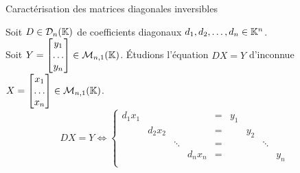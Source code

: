 \documentclass{article}
\renewenvironment{question_kholle}[2][ ]
{
	\subsection{\texorpdfstring{#2}{}}
	\notblank{#1}
	{
		\noindent #1
		\bigbreak
	}
	{}
	\begin{proof}
}
{
	\end{proof}
}
\begin{document}
\begin{question_kholle}
  [Une matrice diagonale est inversible si et seulement si tous ses coefficients diagonaux sont non nuls.
    \begin{equation}
      \forall D = diag(d_1, d_2, \ldots, d_n) \in \mathcal{D}_n(\K),
      D \in \mathcal{GL}_n(\K) \iff \prod_{i=1}^{n} d_i \neq 0
    \end{equation}]
  {Caractérisation des matrices diagonales inversibles}

  Soit $D \in \mathcal{D}_n(\mathbb K)$ de coefficients diagonaux $d_1, d_2, \ldots, d_n \in \mathbb K^n$. \\
  Soit $Y = \begin{bmatrix} y_1 \\ \ldots \\ y_n \end{bmatrix} \in \mathcal{M}_{n,1}(\mathbb K)$.
  \'Etudions l'équation $DX = Y$ d'inconnue $X = \begin{bmatrix} x_1 \\ \ldots \\ x_n \end{bmatrix} \in \mathcal{M}_{n,1}(\mathbb K)$.
  \begin{equation*}
    DX = Y \iff
    \left\{ \begin{array}{cccccccccc}
      d_1 x_1 &         &        &         & = & y_1 &     &        &       \\
              & d_2 x_2 &        &         & = &     & y_2 &        &     & \\
              &         & \ddots &         & = &     &     & \ddots &       \\
              &         &        & d_n x_n & = &     &     &        & y_n   \\
    \end{array} \right.
  \end{equation*}


\end{question_kholle}
\end{document}

